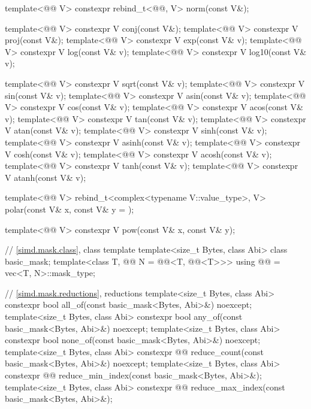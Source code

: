 \begin{codeblock}
{  template<@@ V>
    constexpr rebind_t<@@, V> norm(const V&);

  template<@@ V> constexpr V conj(const V&);
  template<@@ V> constexpr V proj(const V&);
  template<@@ V> constexpr V exp(const V& v);
  template<@@ V> constexpr V log(const V& v);
  template<@@ V> constexpr V log10(const V& v);

  template<@@ V> constexpr V sqrt(const V& v);
  template<@@ V> constexpr V sin(const V& v);
  template<@@ V> constexpr V asin(const V& v);
  template<@@ V> constexpr V cos(const V& v);
  template<@@ V> constexpr V acos(const V& v);
  template<@@ V> constexpr V tan(const V& v);
  template<@@ V> constexpr V atan(const V& v);
  template<@@ V> constexpr V sinh(const V& v);
  template<@@ V> constexpr V asinh(const V& v);
  template<@@ V> constexpr V cosh(const V& v);
  template<@@ V> constexpr V acosh(const V& v);
  template<@@ V> constexpr V tanh(const V& v);
  template<@@ V> constexpr V atanh(const V& v);

  template<@@ V>
    rebind_t<complex<typename V::value_type>, V> polar(const V& x, const V& y = {});

  template<@@ V> constexpr V pow(const V& x, const V& y);

  // \ref{simd.mask.class}, class template 
  template<size_t Bytes, class Abi> class basic_mask;
  template<class T, @@ N = @@<T, @@<T>>>
    using @@ = vec<T, N>::mask_type;

  // \ref{simd.mask.reductions}, reductions
  template<size_t Bytes, class Abi>
    constexpr bool all_of(const basic_mask<Bytes, Abi>&) noexcept;
  template<size_t Bytes, class Abi>
    constexpr bool any_of(const basic_mask<Bytes, Abi>&) noexcept;
  template<size_t Bytes, class Abi>
    constexpr bool none_of(const basic_mask<Bytes, Abi>&) noexcept;
  template<size_t Bytes, class Abi>
    constexpr @@ reduce_count(const basic_mask<Bytes, Abi>&) noexcept;
  template<size_t Bytes, class Abi>
    constexpr @@ reduce_min_index(const basic_mask<Bytes, Abi>&);
  template<size_t Bytes, class Abi>
    constexpr @@ reduce_max_index(const basic_mask<Bytes, Abi>&);

}
\end{codeblock}
